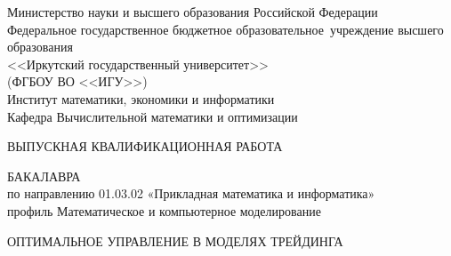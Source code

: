 
\begin{titlepage}
\begin{center}
Министерство науки и высшего образования Российской Федерации\\

	Федеральное государственное бюджетное образовательное\
учреждение высшего образования\\
	
<<Иркутский государственный университет>>\\

	(ФГБОУ ВО <<ИГУ>>)\\
	
Институт математики, экономики и информатики\\

	Кафедра Вычислительной математики и оптимизации\\

\end{center}


\vspace{2.7cm}


\begin{center}
	
{\bf 
		
ВЫПУСКНАЯ КВАЛИФИКАЦИОННАЯ РАБОТА
		
БАКАЛАВРА\\[1mm]

по направлению 01.03.02 «Прикладная математика и информатика»\\[1mm]
	
профиль  Математическое и компьютерное моделирование 	
}  
	
	\vspace{0.9cm}
	
{
		
ОПТИМАЛЬНОЕ УПРАВЛЕНИЕ В МОДЕЛЯХ ТРЕЙДИНГА
} %

\end{center}


 
 

\end{titlepage}
